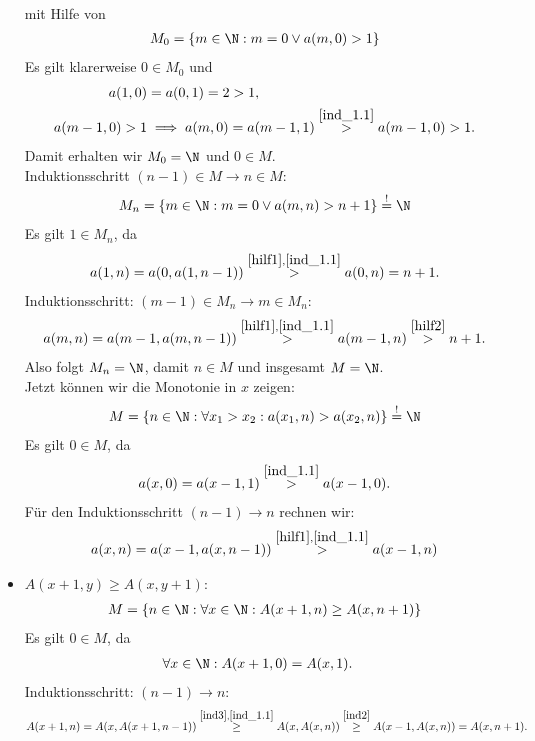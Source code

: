 \begin{solution}
\begin{itemize}
\begin{align}
  \end{align}
  mit Hilfe von
  \begin{align*}
    M_0 =  \{m \in \N: m = 0 \lor a(m,0) > 1\}
  \end{align*}
  Es gilt klarerweise $0 \in M_0$ und
  \begin{align*}
    a(1,0) &= a(0,1) = 2 > 1, \\
    a(m-1,0) > 1 &\implies a(m,0) = a(m-1,1) \stackrel{\eqref{ind_1.1}}{>} a(m-1,0) > 1.
  \end{align*}
  Damit erhalten wir $M_0 = \N$ und $0 \in M$. \\
  Induktionsschritt $(n-1) \in M \rightarrow n \in M$:
  \begin{align}\label{hilf2}
    M_n =  \{m \in \N: m = 0 \lor a(m,n) > n + 1\} \stackrel{!}{=} \N
  \end{align}
  Es gilt $1 \in M_n$, da
  \begin{align*}
    a(1,n) = a(0,a(1,n-1)) \stackrel{\eqref{hilf1},\eqref{ind_1.1}}{>} a(0,n) = n + 1.
  \end{align*}
  Induktionsschritt: $(m-1) \in M_n \rightarrow m \in M_n$:
  \begin{align*}
    a(m,n) = a(m-1,a(m,n-1)) \stackrel{\eqref{hilf1},\eqref{ind_1.1}}{>}
    a(m-1,n) \stackrel{\eqref{hilf2}}{>} n + 1.
  \end{align*}
  Also folgt $M_n = \N$, damit $n \in M$ und insgesamt $M = \N$. \\
  Jetzt können wir die Monotonie in $x$ zeigen:
  \begin{align}\label{ind2}
    M = \{n \in \N: \forall x_1 > x_2: a(x_1,n) > a(x_2,n)\} \stackrel{!}{=} \N
  \end{align}
  Es gilt $0 \in M$, da
  \begin{align*}
    a(x,0) = a(x-1,1) \stackrel{\eqref{ind_1.1}}{>} a(x-1,0).
  \end{align*}
  Für den Induktionsschritt $(n-1) \rightarrow n$ rechnen wir:
  \begin{align*}
    a(x,n) = a(x-1,a(x,n-1)) \stackrel{\eqref{hilf1},\eqref{ind_1.1}}{>} a(x-1,n)
  \end{align*}
  \item $A(x+1,y) \geq A(x,y+1)$:
  \begin{align}\label{ind3}
    M = \{n \in \N: \forall x \in \N: A(x+1,n) \geq A(x,n+1)\}
  \end{align}
  Es gilt $0 \in M$, da
  \begin{align*}
    \forall x \in \N: A(x+1,0) &= A(x,1).
  \end{align*}
  Induktionsschritt: $(n-1) \rightarrow n$:
  \begin{align*}
    A(x+1,n) = A(x,A(x+1,n-1)) \stackrel{\eqref{ind3},\eqref{ind_1.1}}{\geq} A(x,A(x,n))
    \stackrel{\eqref{ind2}}{\geq} A(x-1,A(x,n)) = A(x,n+1).
  \end{align*}
\end{itemize}

\end{solution}
